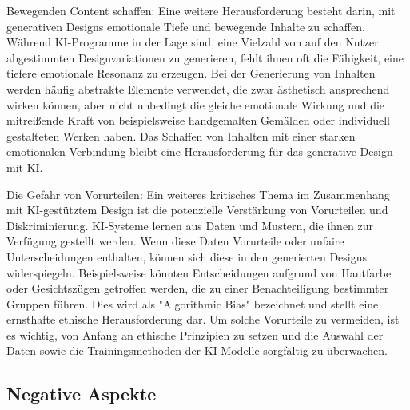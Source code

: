 Bewegenden Content schaffen:
Eine weitere Herausforderung besteht darin, mit generativen Designs emotionale Tiefe und bewegende Inhalte
 zu schaffen. Während KI-Programme in der Lage sind, eine Vielzahl von auf den Nutzer abgestimmten Designvariationen 
 zu generieren, fehlt ihnen oft die Fähigkeit, eine tiefere emotionale Resonanz zu erzeugen. Bei der Generierung von 
 Inhalten werden häufig abstrakte Elemente verwendet, die zwar ästhetisch ansprechend wirken können, aber nicht unbedingt 
 die gleiche emotionale Wirkung und die mitreißende Kraft von beispielsweise handgemalten Gemälden oder individuell 
 gestalteten Werken haben. Das Schaffen von Inhalten mit einer starken emotionalen Verbindung bleibt eine Herausforderung 
 für das generative Design mit KI.

Die Gefahr von Vorurteilen:
Ein weiteres kritisches Thema im Zusammenhang mit KI-gestütztem Design ist die potenzielle Verstärkung von 
Vorurteilen und Diskriminierung. KI-Systeme lernen aus Daten und Mustern, die ihnen zur Verfügung gestellt werden. 
Wenn diese Daten Vorurteile oder unfaire Unterscheidungen enthalten, können sich diese in den generierten Designs 
widerspiegeln. Beispielsweise könnten Entscheidungen aufgrund von Hautfarbe oder Gesichtszügen getroffen werden, 
die zu einer Benachteiligung bestimmter Gruppen führen. Dies wird als "Algorithmic Bias" bezeichnet und stellt eine 
ernsthafte ethische Herausforderung dar. Um solche Vorurteile zu vermeiden, ist es wichtig, von Anfang an ethische 
Prinzipien zu setzen und die Auswahl der Daten sowie die Trainingsmethoden der KI-Modelle sorgfältig zu überwachen.

\subsection*{Negative Aspekte}